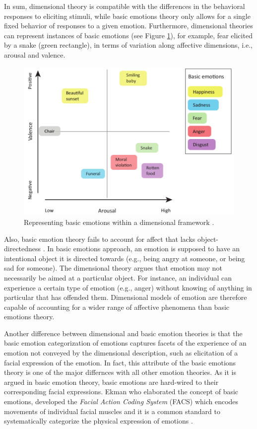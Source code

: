 \documentclass[11pt]{article}
\begin{document}
In sum, dimensional theory is compatible with the differences in the behavioral
responses to eliciting stimuli, while basic emotions theory only allows for a
single fixed behavior of responses to a given emotion. Furthermore, dimensional
theories can represent instances of basic emotions (see Figure
\ref{fig:dimensional-discrete}), for example, fear elicited by a snake (green
rectangle), in terms of variation along affective dimensions, i.e., arousal and
valence.

\begin{figure}[tbh]
  \center
  \includegraphics[width=.9\textwidth]{figure/dimensional-discrete.png}
  \caption{Representing basic emotions within a dimensional framework
  \cite{hamann:mapping-discrete-dimensional}.}
  \label{fig:dimensional-discrete}
\end{figure}

Also, basic emotion theory fails to account for affect that lacks
object-directedness \cite{russell:core-affect}. In basic emotions approach, an
emotion is supposed to have an intentional object it is directed towards (e.g.,
being angry at someone, or being sad for someone). The dimensional theory argues
that emotion may not necessarily be aimed at a particular object. For instance,
an individual can experience a certain type of emotion (e.g., anger) without
knowing of anything in particular that has offended them. Dimensional models of
emotion are therefore capable of accounting for a wider range of affective
phenomena than basic emotions theory.

Another difference between dimensional and basic emotion theories is that the
basic emotion categorization of emotions captures facets of the experience of
an emotion not conveyed by the dimensional description, such as elicitation of a
facial expression of the emotion. In fact, this attribute of the basic
emotions theory is one of the major differnces with all other emotion theories.
As it is argued in basic emotion theory, basic emotions are hard-wired to their
corresponding facial expressions. Ekman who elaborated the concept of basic
emotions, developed the \textit{Facial Action Coding System} (FACS) which
encodes movements of individual facial muscles and it is a common standard to
systematically categorize the physical expression of emotions
\cite{ekman:facial-movement}.
\end{document}
